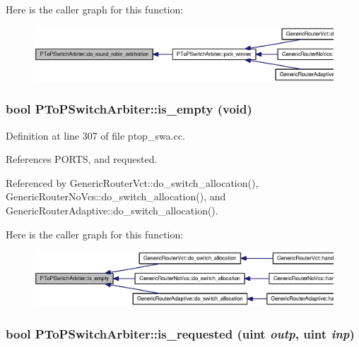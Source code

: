 Here is the caller graph for this function:\nopagebreak
\begin{figure}[H]
\begin{center}
\leavevmode
\includegraphics[width=420pt]{classPToPSwitchArbiter_bb10205ca5104e0be5519bd336fb85e1_icgraph}
\end{center}
\end{figure}
\subsubsection[{is\_\-empty}]{\setlength{\rightskip}{0pt plus 5cm}bool PToPSwitchArbiter::is\_\-empty (void)}\label{classPToPSwitchArbiter_20a229615b20e987aaa0291af0805e31}




Definition at line 307 of file ptop\_\-swa.cc.

References PORTS, and requested.

Referenced by GenericRouterVct::do\_\-switch\_\-allocation(), GenericRouterNoVcs::do\_\-switch\_\-allocation(), and GenericRouterAdaptive::do\_\-switch\_\-allocation().

Here is the caller graph for this function:\nopagebreak
\begin{figure}[H]
\begin{center}
\leavevmode
\includegraphics[width=420pt]{classPToPSwitchArbiter_20a229615b20e987aaa0291af0805e31_icgraph}
\end{center}
\end{figure}
\subsubsection[{is\_\-requested}]{\setlength{\rightskip}{0pt plus 5cm}bool PToPSwitchArbiter::is\_\-requested ({\bf uint} {\em outp}, \/  {\bf uint} {\em inp})}\label{classPToPSwitchArbiter_3c4eeb723ecb521a82a4518820e48896}




